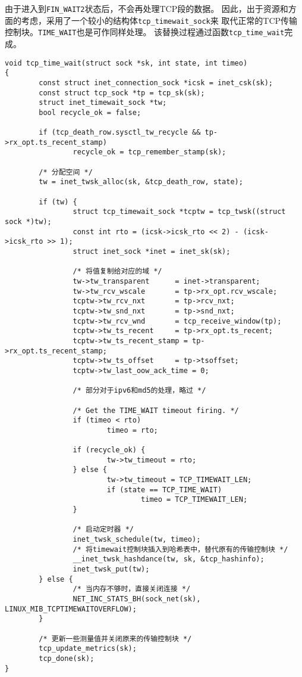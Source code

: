 由于进入到\texttt{FIN_WAIT2}状态后，不会再处理TCP段的数据。
因此，出于资源和方面的考虑，采用了一个较小的结构体\texttt{tcp_timewait_sock}来
取代正常的TCP传输控制块。\texttt{TIME_WAIT}也是可作同样处理。
该替换过程通过函数\texttt{tcp_time_wait}完成。
\begin{verbatim}
void tcp_time_wait(struct sock *sk, int state, int timeo)
{
        const struct inet_connection_sock *icsk = inet_csk(sk);
        const struct tcp_sock *tp = tcp_sk(sk);
        struct inet_timewait_sock *tw;
        bool recycle_ok = false;

        if (tcp_death_row.sysctl_tw_recycle && tp->rx_opt.ts_recent_stamp)
                recycle_ok = tcp_remember_stamp(sk);

        /* 分配空间 */
        tw = inet_twsk_alloc(sk, &tcp_death_row, state);

        if (tw) {
                struct tcp_timewait_sock *tcptw = tcp_twsk((struct sock *)tw);
                const int rto = (icsk->icsk_rto << 2) - (icsk->icsk_rto >> 1);
                struct inet_sock *inet = inet_sk(sk);

                /* 将值复制给对应的域 */
                tw->tw_transparent      = inet->transparent;
                tw->tw_rcv_wscale       = tp->rx_opt.rcv_wscale;
                tcptw->tw_rcv_nxt       = tp->rcv_nxt;
                tcptw->tw_snd_nxt       = tp->snd_nxt;
                tcptw->tw_rcv_wnd       = tcp_receive_window(tp);
                tcptw->tw_ts_recent     = tp->rx_opt.ts_recent;
                tcptw->tw_ts_recent_stamp = tp->rx_opt.ts_recent_stamp;
                tcptw->tw_ts_offset     = tp->tsoffset;
                tcptw->tw_last_oow_ack_time = 0;

                /* 部分对于ipv6和md5的处理，略过 */

                /* Get the TIME_WAIT timeout firing. */
                if (timeo < rto)
                        timeo = rto;

                if (recycle_ok) {
                        tw->tw_timeout = rto;
                } else {
                        tw->tw_timeout = TCP_TIMEWAIT_LEN;
                        if (state == TCP_TIME_WAIT)
                                timeo = TCP_TIMEWAIT_LEN;
                }

                /* 启动定时器 */
                inet_twsk_schedule(tw, timeo);
                /* 将timewait控制块插入到哈希表中，替代原有的传输控制块 */
                __inet_twsk_hashdance(tw, sk, &tcp_hashinfo);
                inet_twsk_put(tw);
        } else {
                /* 当内存不够时，直接关闭连接 */
                NET_INC_STATS_BH(sock_net(sk), LINUX_MIB_TCPTIMEWAITOVERFLOW);
        }

        /* 更新一些测量值并关闭原来的传输控制块 */
        tcp_update_metrics(sk);
        tcp_done(sk);
}
\end{verbatim}

